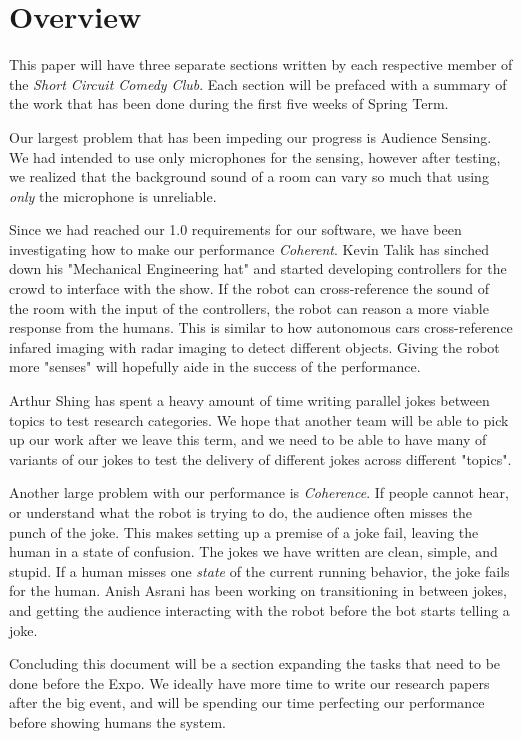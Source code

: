 \documentclass[onecolumn, draftclsnofoot,10pt, compsoc]{IEEEtran}
\begin{document}
\section{Overview}
	This paper will have three separate sections written by each respective member of the \textit{Short Circuit Comedy Club}.
Each section will be prefaced with a summary of the work that has been done during the first five weeks of Spring Term.


Our largest problem that has been impeding our progress is Audience Sensing.
We had intended to use only microphones for the sensing, however after testing, we realized that the background sound of a room can vary so much that using \textit{only} the microphone is unreliable.

Since we had reached our 1.0 requirements for our software, we have been investigating how to make our performance \textit{Coherent}. Kevin Talik has sinched down his "Mechanical Engineering hat" and started developing controllers for the crowd to interface with the show. If the robot can cross-reference the sound of the room with the input of the controllers, the robot can reason a more viable response from the humans. This is similar to how autonomous cars cross-reference infared imaging with radar imaging to detect different objects. Giving the robot more "senses" will hopefully aide in the success of the performance.

Arthur Shing has spent a heavy amount of time writing parallel jokes between topics to test research categories. We hope that another team will be able to pick up our work after we leave this term, and we need to be able to have many of variants of our jokes to test the delivery of different jokes across different "topics".

Another large problem with our performance is \textit{Coherence}. If people cannot hear, or understand what the robot is trying to do, the audience often misses the punch of the joke.
This makes setting up a premise of a joke fail, leaving the human in a state of confusion. The jokes we have written are clean, simple, and stupid. If a human misses one \textit{state} of the current running behavior, the joke fails for the human.
Anish Asrani has been working on transitioning in between jokes, and getting the audience interacting with the robot before the bot starts telling a joke.

Concluding this document will be a section expanding the tasks that need to be done before the Expo. We ideally have more time to write our research papers after the big event, and will be spending our time perfecting our performance before showing humans the system.
\end{document}
